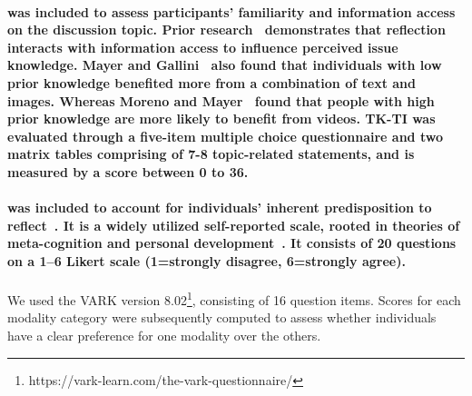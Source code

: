 \paragraph{ was included to assess participants' familiarity and information access on the discussion topic. Prior research~\cite{zhang2021nudge} demonstrates that reflection interacts with information access to influence perceived issue knowledge. Mayer and Gallini~\cite{mayer1990illustration} also found that individuals with low prior knowledge benefited more from a combination of text and images. %
Whereas Moreno and Mayer~\cite{moreno1999cognitive} found that people with high prior knowledge are more likely to benefit from videos. TK-TI was evaluated through a five-item multiple choice questionnaire and two matrix tables comprising of 7-8 topic-related statements, and is measured by a score between 0 to 36.}

\paragraph{ was included to account for individuals' inherent predisposition to reflect~\cite{grant2002self, silvia2022self}. It is a widely utilized self-reported scale, rooted in theories of meta-cognition and personal development~\cite{grant2001rethinking, grant2003impact}. It consists of 20 questions on a 1–6 Likert scale (1=strongly disagree, 6=strongly agree).} %

\paragraph{} We used the VARK version 8.02\footnote{https://vark-learn.com/the-vark-questionnaire/}, consisting of 16 question items. Scores for each modality category were subsequently computed to assess whether individuals have a clear preference for one modality over the others. 

